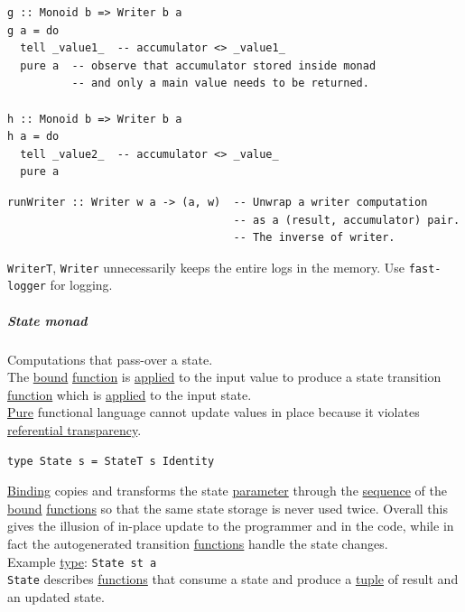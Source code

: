 \documentclass[a4paper,14pt,oneside]{book}
\begin{document}
{\begin{verbatim}
g :: Monoid b => Writer b a
g a = do
  tell _value1_  -- accumulator <> _value1_
  pure a  -- observe that accumulator stored inside monad
          -- and only a main value needs to be returned.

h :: Monoid b => Writer b a
h a = do
  tell _value2_  -- accumulator <> _value_
  pure a
\end{verbatim}

\begin{verbatim}
runWriter :: Writer w a -> (a, w)  -- Unwrap a writer computation
                                   -- as a (result, accumulator) pair.
                                   -- The inverse of writer.
\end{verbatim}

\texttt{WriterT}, \texttt{Writer} unnecessarily keeps the entire logs in the memory. Use \texttt{fast-logger} for logging.\\

\subparagraph{\label{org6194200}State monad}
\label{sec:org69b71d2}
Computations that pass-over a state.\\

The \hyperref[orgda0d3e7]{bound} \hyperref[org6a60524]{function} is \hyperref[orgd497efc]{applied} to the input value to produce a state transition \hyperref[org6a60524]{function} which is \hyperref[orgd497efc]{applied} to the input state.\\

\hyperref[org1ebaedd]{Pure} functional language cannot update values in place because it violates \hyperref[orgb12a5f0]{referential transparency}.\\

\begin{verbatim}
type State s = StateT s Identity
\end{verbatim}

\hyperref[orgff5fd2b]{Binding} copies and transforms the state \hyperref[org0db8baa]{parameter} through the \hyperref[org3e94228]{sequence} of the \hyperref[orgda0d3e7]{bound} \hyperref[orgf33f5fb]{functions} so that the same state storage is never used twice. Overall this gives the illusion of in-place update to the programmer and in the code, while in fact the autogenerated transition \hyperref[orgf33f5fb]{functions} handle the state changes.\\

Example \hyperref[orga9ca243]{type}: \texttt{State st a}\\

\texttt{State} describes \hyperref[orgf33f5fb]{functions} that consume a state and produce a \hyperref[org666c273]{tuple} of result and an updated state.\\

}
\end{document}
